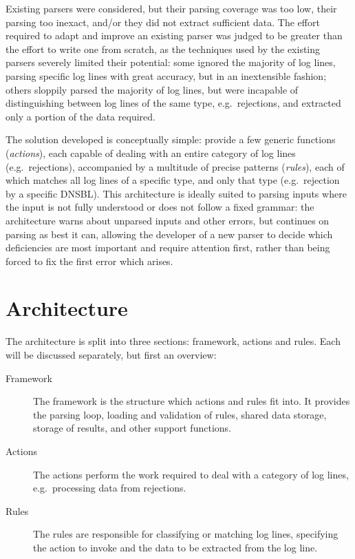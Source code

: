 \documentclass[draft]{svmult}
\begin{document}
Existing parsers were considered, but their parsing coverage was too low,
their parsing too inexact, and/or they did not extract sufficient data.
The effort required to adapt and improve an existing parser was judged to
be greater than the effort to write one from scratch, as the techniques
used by the existing parsers severely limited their potential: some ignored
the majority of log lines, parsing specific log lines with great accuracy,
but in an inextensible fashion; others sloppily parsed the majority of log
lines, but were incapable of distinguishing between log lines of the same
type, e.g.\ rejections, and extracted only a portion of the data required.

The solution developed is conceptually simple: provide a few generic
functions (\textit{actions\/}), each capable of dealing with an entire
category of log lines (e.g.\ rejections), accompanied by a multitude of
precise patterns (\textit{rules\/}), each of which matches all log lines of
a specific type, and only that type (e.g.\ rejection by a specific DNSBL).
This architecture is ideally suited to parsing inputs where the input is
not fully understood or does not follow a fixed grammar: the architecture
warns about unparsed inputs and other errors, but continues on parsing as
best it can, allowing the developer of a new parser to decide which
deficiencies are most important and require attention first, rather than
being forced to fix the first error which arises.

\section{Architecture}

\label{Architecture}

The architecture is split into three sections: framework, actions and
rules.  Each will be discussed separately, but first an overview:

\begin{description}

    \item [Framework]  The framework is the structure which actions and
        rules fit into.  It provides the parsing loop, loading and
        validation of rules, shared data storage, storage of results, and
        other support functions.

    \item [Actions]  The actions perform the work required to deal with a
        category of log lines, e.g.\ processing data from rejections.

    \item [Rules]  The rules are responsible for classifying or matching
        log lines, specifying the action to invoke and the data to be
        extracted from the log line.

\end{description}
\end{document}
